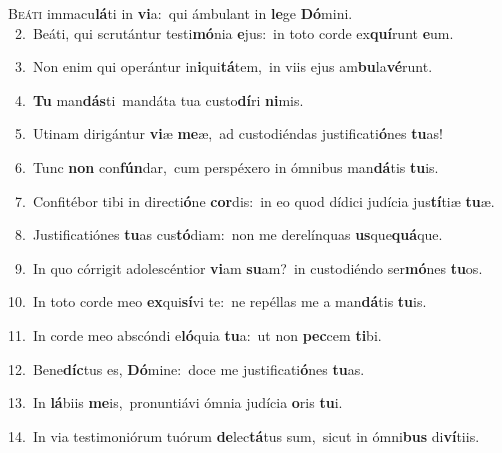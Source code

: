 \lettrine{\initial\textcolor{\initialcolor}{B}}{eáti} immacu\-\textbf{lá}\-ti in \textbf{vi}\-a:~\star qui ámbulant in \textbf{le}\-ge \textbf{Dó}\-mini.\\
{\numbfont\textcolor{\numbcolor}{~2.}}~Beáti, qui scrutántur testi\-\textbf{mó}\-nia \textbf{e}\-jus:~\star in toto corde ex\-\textbf{quí}\-runt \textbf{e}\-um.\par
{\numbfont\textcolor{\numbcolor}{~3.}}~Non enim qui operántur in\-\textbf{i}\-qui\-\textbf{tá}\-tem,~\star in viis ejus am\-\textbf{bu}\-la\-\textbf{vé}\-runt.\par
{\numbfont\textcolor{\numbcolor}{~4.}}~\textbf{Tu} man\-\textbf{dás}\-ti~\star mandáta tua custo\-\textbf{dí}\-ri \textbf{ni}\-mis.\par
{\numbfont\textcolor{\numbcolor}{~5.}}~Utinam dirigántur \textbf{vi}\-æ \textbf{me}\-æ,~\star ad custodiéndas justificati\-\textbf{ó}\-nes \textbf{tu}\-as!\par
{\numbfont\textcolor{\numbcolor}{~6.}}~Tunc \textbf{non} con\-\textbf{fún}\-dar,~\star cum perspéxero in ómnibus man\-\textbf{dá}\-tis \textbf{tu}\-is.\par
{\numbfont\textcolor{\numbcolor}{~7.}}~Confitébor tibi in directi\-\textbf{ó}\-ne \textbf{cor}\-dis:~\star in eo quod dídici judícia jus\-\textbf{tí}\-tiæ \textbf{tu}\-æ.\par
{\numbfont\textcolor{\numbcolor}{~8.}}~Justificatiónes \textbf{tu}\-as cus\-\textbf{tó}\-diam:~\star non me derelínquas \textbf{us}\-que\-\textbf{quá}\-que.\par
{\numbfont\textcolor{\numbcolor}{~9.}}~In quo córrigit adolescéntior \textbf{vi}\-am \textbf{su}\-am?~\star in custodiéndo ser\-\textbf{mó}\-nes \textbf{tu}\-os.\par
{\numbfont\textcolor{\numbcolor}{10.}}~In toto corde meo \textbf{ex}\-qui\-\textbf{sí}\-vi te:~\star ne repéllas me a man\-\textbf{dá}\-tis \textbf{tu}\-is.\par
{\numbfont\textcolor{\numbcolor}{11.}}~In corde meo abscóndi e\-\textbf{ló}\-quia \textbf{tu}\-a:~\star ut non \textbf{pec}\-cem \textbf{ti}\-bi.\par
{\numbfont\textcolor{\numbcolor}{12.}}~Bene\-\textbf{díc}\-tus es, \textbf{Dó}\-mine:~\star doce me justificati\-\textbf{ó}\-nes \textbf{tu}\-as.\par
{\numbfont\textcolor{\numbcolor}{13.}}~In \textbf{lá}\-biis \textbf{me}\-is,~\star pronuntiávi ómnia judícia \textbf{o}\-ris \textbf{tu}\-i.\par
{\numbfont\textcolor{\numbcolor}{14.}}~In via testimoniórum tuórum \textbf{de}\-lec\-\textbf{tá}\-tus sum,~\star sicut in ómni\textbf{bus} di\-\textbf{ví}\-tiis.\par
